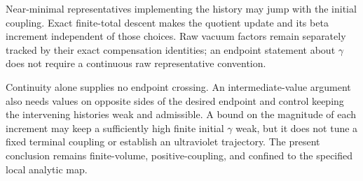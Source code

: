 Near-minimal representatives implementing the history may
jump with the initial coupling. Exact finite-total descent
makes the quotient update and its beta increment independent
of those choices. Raw vacuum factors remain separately
tracked by their exact compensation identities; an endpoint
statement about $\gamma$ does not require a continuous raw
representative convention.

Continuity alone supplies no endpoint crossing. An
intermediate-value argument also needs values on opposite
sides of the desired endpoint and control keeping the
intervening histories weak and admissible. A bound on the
magnitude of each increment may keep a sufficiently high
finite initial $\gamma$ weak, but it does not tune a fixed
terminal coupling or establish an ultraviolet trajectory.
The present conclusion remains finite-volume, positive-coupling,
and confined to the specified local analytic map.
